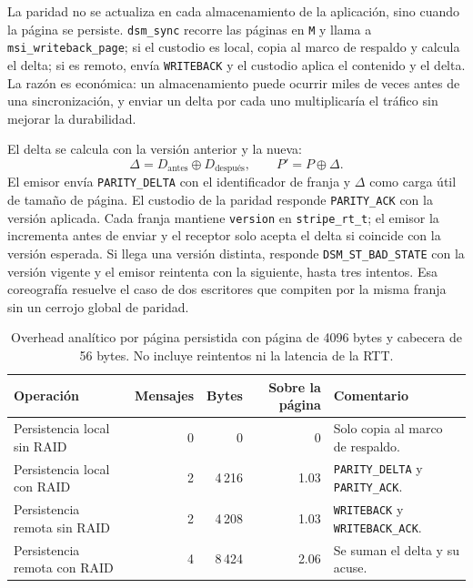 \documentclass[11pt,spanish]{article}
\begin{document}
La paridad no se actualiza en cada almacenamiento de la aplicación, sino cuando la página se persiste. \texttt{dsm\_sync} recorre las páginas en \texttt{M} y llama a \texttt{msi\_writeback\_page}; si el custodio es local, copia al marco de respaldo y calcula el delta; si es remoto, envía \texttt{WRITEBACK} y el custodio aplica el contenido y el delta. La razón es económica: un almacenamiento puede ocurrir miles de veces antes de una sincronización, y enviar un delta por cada uno multiplicaría el tráfico sin mejorar la durabilidad.

El delta se calcula con la versión anterior y la nueva:
\begin{equation}
\Delta = D_{\text{antes}} \oplus D_{\text{después}}, \qquad P' = P \oplus \Delta.
\end{equation}
El emisor envía \texttt{PARITY\_DELTA} con el identificador de franja y $\Delta$ como carga útil de tamaño de página. El custodio de la paridad responde \texttt{PARITY\_ACK} con la versión aplicada. Cada franja mantiene \texttt{version} en \texttt{stripe\_rt\_t}; el emisor la incrementa antes de enviar y el receptor solo acepta el delta si coincide con la versión esperada. Si llega una versión distinta, responde \texttt{DSM\_ST\_BAD\_STATE} con la versión vigente y el emisor reintenta con la siguiente, hasta tres intentos. Esa coreografía resuelve el caso de dos escritores que compiten por la misma franja sin un cerrojo global de paridad.

\begin{table}[H]
\centering
\small
\begin{tabularx}{\linewidth}{l r r r Y}
\toprule
\textbf{Operación} & \textbf{Mensajes} & \textbf{Bytes} & \textbf{Sobre la página} & \textbf{Comentario} \\
\midrule
Persistencia local sin RAID & 0 & 0 & 0 & Solo copia al marco de respaldo. \\
Persistencia local con RAID & 2 & 4\,216 & 1.03 & \texttt{PARITY\_DELTA} y \texttt{PARITY\_ACK}. \\
Persistencia remota sin RAID & 2 & 4\,208 & 1.03 & \texttt{WRITEBACK} y \texttt{WRITEBACK\_ACK}. \\
Persistencia remota con RAID & 4 & 8\,424 & 2.06 & Se suman el delta y su acuse. \\
\bottomrule
\end{tabularx}
\caption{Overhead analítico por página persistida con página de 4096 bytes y cabecera de 56 bytes. No incluye reintentos ni la latencia de la RTT.}
\label{tab:overhead}
\end{table}
\end{document}
